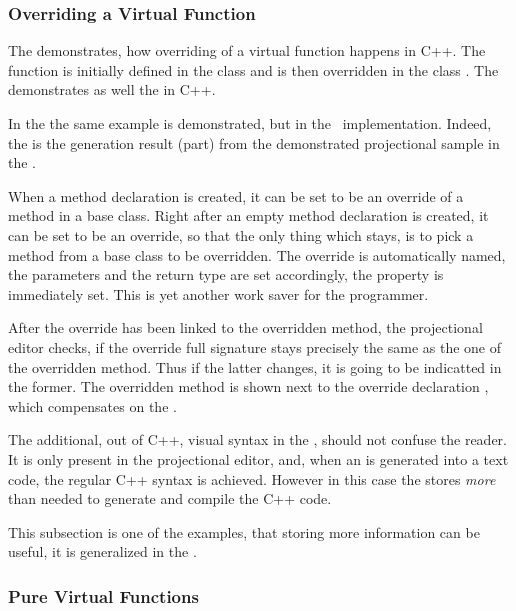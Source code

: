 \subsubsection{Overriding a Virtual Function}
\label{overridefunction}

The  demonstrates, how overriding of a virtual function happens in C++.
The function  is initially defined in the class  and is then overridden
in the class . The  demonstrates as well the  in C++.


In the  the same example is demonstrated, but in the \pcpp\ implementation.
Indeed, the  is the generation result (part) from the demonstrated projectional sample in
the .

When a method declaration is created, it can be set to be an override of a method in a base class.
Right after an empty method declaration is created, it can be set to be an override, so that the only
thing which stays, is to pick a method from a base class to be overridden. The override is automatically
named, the parameters and the return type are set accordingly, the  property is immediately
set. This is yet another work saver for the programmer.

After the override has been linked to the overridden method, the projectional editor checks, if 
the override full signature stays precisely the same as the one of the overridden method. Thus if the 
latter changes, it is going to be indicatted in the former.
The overridden method is shown next to the override declaration , which 
compensates on the .


The additional, out of C++, visual syntax in the \pcpp, should not confuse the reader. It is only 
present in the projectional editor, and, when an  is generated into a text code, the regular
C++ syntax is achieved. However in this case the  stores \emph{more} than needed to 
generate and compile the C++ code. 

This subsection is one of the examples, that storing more information can be useful,
it is generalized in the .


\subsubsection{Pure Virtual Functions}
\label{purevirtualfuncs}

